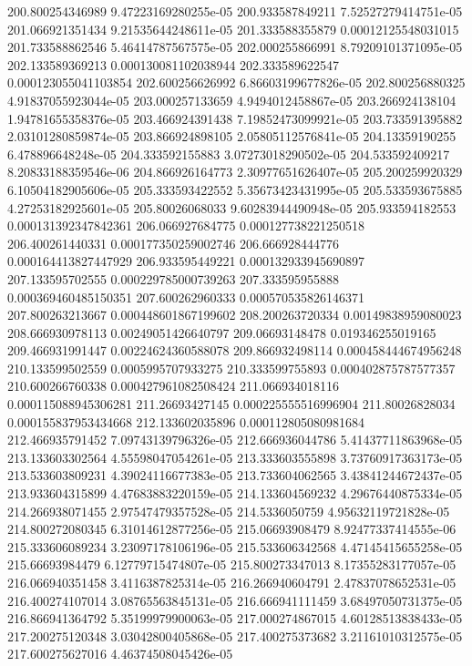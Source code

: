 {200.800254346989 9.47223169280255e-05
200.933587849211 7.52527279414751e-05
201.066921351434 9.21535644248611e-05
201.333588355879 0.00012125548031015
201.733588862546 5.46414787567575e-05
202.000255866991 8.79209101371095e-05
202.133589369213 0.000130081102038944
202.333589622547 0.000123055041103854
202.600256626992 6.86603199677826e-05
202.800256880325 4.91837055923044e-05
203.000257133659 4.9494012458867e-05
203.266924138104 1.94781655358376e-05
203.466924391438 7.19852473099921e-05
203.733591395882 2.03101280859874e-05
203.866924898105 2.05805112576841e-05
204.13359190255 6.478896648248e-05
204.333592155883 3.07273018290502e-05
204.533592409217 8.20833188359546e-06
204.866926164773 2.30977651626407e-05
205.200259920329 6.10504182905606e-05
205.333593422552 5.35673423431995e-05
205.533593675885 4.27253182925601e-05
205.80026068033 9.60283944490948e-05
205.933594182553 0.000131392347842361
206.066927684775 0.000127738221250518
206.400261440331 0.000177350259002746
206.666928444776 0.000164413827447929
206.933595449221 0.000132933945690897
207.133595702555 0.000229785000739263
207.333595955888 0.000369460485150351
207.600262960333 0.000570535826146371
207.800263213667 0.000448601867199602
208.200263720334 0.00149838959080023
208.666930978113 0.00249051426640797
209.06693148478 0.019346255019165
209.466931991447 0.00224624360588078
209.866932498114 0.000458444674956248
210.133599502559 0.0005995707933275
210.333599755893 0.000402875787577357
210.600266760338 0.000427961082508424
211.066934018116 0.000115088945306281
211.26693427145 0.000225555516996904
211.80026828034 0.000155837953434668
212.133602035896 0.000112805080981684
212.466935791452 7.09743139796326e-05
212.666936044786 5.41437711863968e-05
213.133603302564 4.55598047054261e-05
213.333603555898 3.73760917363173e-05
213.533603809231 4.39024116677383e-05
213.733604062565 3.43841244672437e-05
213.933604315899 4.47683883220159e-05
214.133604569232 4.29676440875334e-05
214.266938071455 2.97547479357528e-05
214.5336050759 4.95632119721828e-05
214.800272080345 6.31014612877256e-05
215.06693908479 8.92477337414555e-06
215.333606089234 3.23097178106196e-05
215.533606342568 4.47145415655258e-05
215.66693984479 6.12779715474807e-05
215.800273347013 8.17355283177057e-05
216.066940351458 3.4116387825314e-05
216.266940604791 2.47837078652531e-05
216.400274107014 3.08765563845131e-05
216.666941111459 3.68497050731375e-05
216.866941364792 5.35199979900063e-05
217.000274867015 4.60128513838433e-05
217.200275120348 3.03042800405868e-05
217.400275373682 3.21161010312575e-05
217.600275627016 4.46374508045426e-05
}
